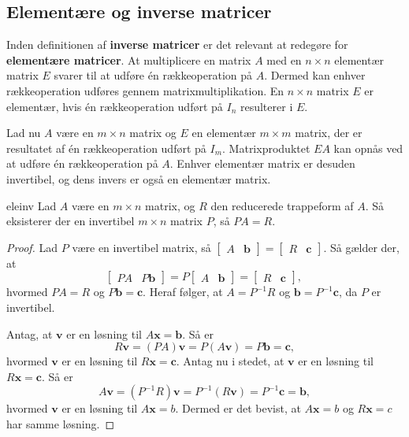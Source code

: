\subsection{Elementære og inverse matricer}
Inden definitionen af \textbf{inverse matricer} er det relevant at redegøre for \textbf{elementære matricer}. 
At multiplicere en matrix $A$ med en $n \times n$ elementær matrix $E$ svarer til at udføre én rækkeoperation på $A$. 
Dermed kan enhver rækkeoperation udføres gennem matrixmultiplikation. 
En $n \times n$ matrix $E$ er elementær, hvis én rækkeoperation udført på $I_n$ resulterer i $E$. 

Lad nu $A$ være en $m \times n$ matrix og $E$ en elementær $m \times m$ matrix, der er resultatet af én rækkeoperation udført på $I_m$. 
Matrixproduktet $EA$ kan opnås ved at udføre én rækkeoperation på $A$. 
Enhver elementær matrix er desuden invertibel, og dens invers er også en elementær matrix. 
%
\begin{thm}{}{eleinv}
Lad $A$ være en $m \times n$ matrix, og $R$ den reducerede trappeform af $A$. 
Så eksisterer der en invertibel $m \times n$ matrix $P$, så $PA=R$.
\end{thm}
%
\begin{proof}
Lad $P$ være en invertibel matrix, så 
$
\begin{bmatrix}
A & \textbf{b}
\end{bmatrix}
=
\begin{bmatrix}
R & \textbf{c}
\end{bmatrix}
$.
Så gælder der, at 
$$
\begin{bmatrix}
PA & P\textbf{b}
\end{bmatrix}
=P
\begin{bmatrix}
A & \textbf{b}
\end{bmatrix}
=
\begin{bmatrix}
R & \textbf{c}
\end{bmatrix}
\text{, }
$$
hvormed $PA=R$ og $P\textbf{b}=\textbf{c}$.
Heraf følger, at $A=P^{-1}R$ og $\textbf{b}=P^{-1}\textbf{c}$, da $P$ er invertibel. 

Antag, at $\textbf{v}$ er en løsning til $A\textbf{x}=\textbf{b}$. Så er
$$
R\textbf{v}=(PA)\textbf{v}=P(A\textbf{v})=P\textbf{b}=\textbf{c},
$$
hvormed $\textbf{v}$ er en løsning til $R\textbf{x}=\textbf{c}$. 
Antag nu i stedet, at $\textbf{v}$ er en løsning til $R\textbf{x}=\textbf{c}$. Så er
$$
A\textbf{v}=(P^{-1}R)\textbf{v}=P^{-1}(R\textbf{v})=P^{-1}\textbf{c}=\textbf{b},
$$
hvormed $\textbf{v}$ er en løsning til $A\textbf{x}=b$. Dermed er det bevist, at $A\textbf{x}=b$ og $R\textbf{x}=c$ har samme løsning.
\end{proof}
